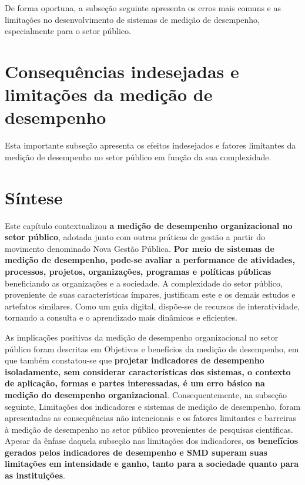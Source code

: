 \documentclass[
  letterpaper,
  DIV=11,
  numbers=noendperiod]{scrreprt}
\begin{document}
De forma oportuna, a subseção seguinte apresenta os erros mais comuns e
as limitações no desenvolvimento de sistemas de medição de desempenho,
especialmente para o setor público.

\hypertarget{consequuxeancias-indesejadas-e-limitauxe7uxf5es-da-mediuxe7uxe3o-de-desempenho}{%
\chapter{Consequências indesejadas e limitações da medição de
desempenho}\label{consequuxeancias-indesejadas-e-limitauxe7uxf5es-da-mediuxe7uxe3o-de-desempenho}}

{Esta importante subseção apresenta os efeitos indesejados e fatores
limitantes da medição de desempenho no setor público em função da sua
complexidade.}

\hypertarget{suxedntese}{%
\chapter*{Síntese}\label{suxedntese}}


Este capítulo contextualizou \textbf{a medição de desempenho
organizacional no setor público}, adotada junto com outras práticas de
gestão a partir do movimento denominado Nova Gestão Pública\emph{.}
\textbf{Por meio de sistemas de medição de desempenho, pode-se avaliar a
performance de atividades, processos, projetos, organizações, programas
e políticas públicas} beneficiando as organizações e a sociedade. A
complexidade do setor público, proveniente de suas características
ímpares, justificam este e os demais estudos e artefatos similares. Como
um guia digital, dispõe-se de recursos de interatividade, tornando a
consulta e o aprendizado mais dinâmicos e eficientes.

As implicações positivas da medição de desempenho organizacional no
setor público foram descritas em Objetivos e benefícios da medição de
desempenho, em que também constatou-se que \textbf{projetar indicadores
de desempenho isoladamente, sem considerar características dos sistemas,
o contexto de aplicação, formas e partes interessadas, é um erro básico
na medição do desempenho organizacional}. Consequentemente, na subseção
seguinte, Limitações dos indicadores e sistemas de medição de
desempenho, foram apresentadas as consequências não intencionais e os
fatores limitantes e barreiras à medição de desempenho no setor público
provenientes de pesquisas científicas. Apesar da ênfase daquela subseção
nas limitações dos indicadores, \textbf{os benefícios gerados pelos
indicadores de desempenho e SMD superam suas limitações em intensidade e
ganho, tanto para a sociedade quanto para as instituições}.
\end{document}
